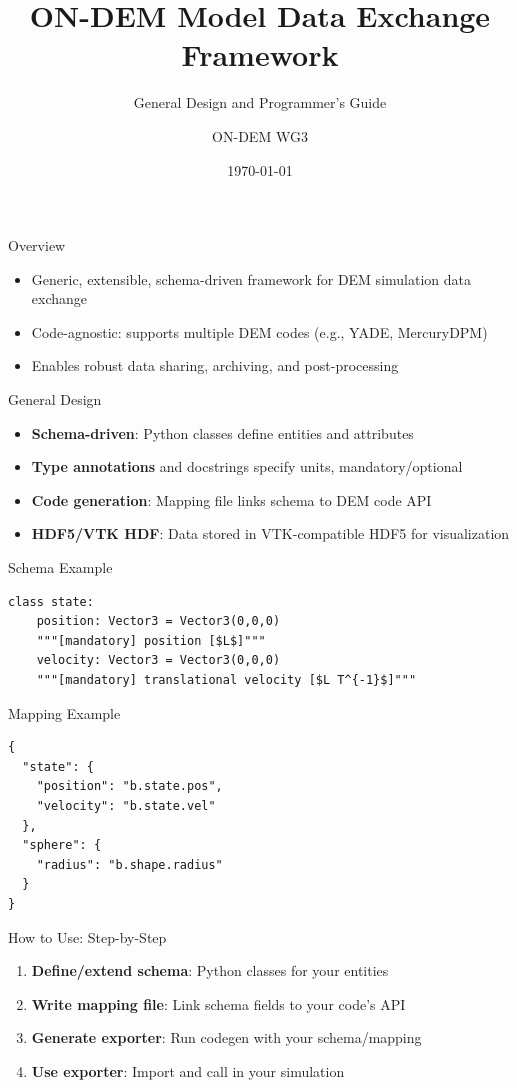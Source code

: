 \documentclass{beamer}
\title{ON-DEM Model Data Exchange Framework}
\subtitle{General Design and Programmer's Guide}
\author{ON-DEM WG3}
\date{\today}
\begin{document}
\begin{frame}
  \titlepage
\end{frame}

\begin{frame}{Overview}
  \begin{itemize}
    \item Generic, extensible, schema-driven framework for DEM simulation data exchange
    \item Code-agnostic: supports multiple DEM codes (e.g., YADE, MercuryDPM)
    \item Enables robust data sharing, archiving, and post-processing
  \end{itemize}
\end{frame}

\begin{frame}{General Design}
  \begin{itemize}
    \item \textbf{Schema-driven}: Python classes define entities and attributes
    \item \textbf{Type annotations} and docstrings specify units, mandatory/optional
    \item \textbf{Code generation}: Mapping file links schema to DEM code API
    \item \textbf{HDF5/VTK HDF}: Data stored in VTK-compatible HDF5 for visualization
  \end{itemize}
\end{frame}

\begin{frame}[fragile]{Schema Example}
\begin{verbatim}
class state:
    position: Vector3 = Vector3(0,0,0)
    """[mandatory] position [$L$]"""
    velocity: Vector3 = Vector3(0,0,0)
    """[mandatory] translational velocity [$L T^{-1}$]"""
\end{verbatim}
\end{frame}

\begin{frame}[fragile]{Mapping Example}
\begin{verbatim}
{
  "state": {
    "position": "b.state.pos",
    "velocity": "b.state.vel"
  },
  "sphere": {
    "radius": "b.shape.radius"
  }
}
\end{verbatim}
\end{frame}

\begin{frame}{How to Use: Step-by-Step}
  \begin{enumerate}
    \item \textbf{Define/extend schema}: Python classes for your entities
    \item \textbf{Write mapping file}: Link schema fields to your code's API
    \item \textbf{Generate exporter}: Run codegen with your schema/mapping
    \item \textbf{Use exporter}: Import and call in your simulation
  \end{enumerate}
\end{frame}
\end{document}
